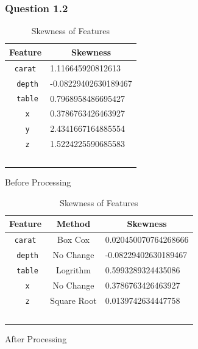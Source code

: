 \documentclass[11pt,letterpaper]{article}
\begin{document}
\subsubsection*{Question 1.2}
\begin{table}[H]
    \begin{subtable}[H]{0.45\textwidth}
    \centering
    \begin{tabular}{c l}
        \hline
        Feature & \multicolumn{1}{c}{Skewness} \\
        \hline
        \texttt{carat} & 1.116645920812613  \\ \
        \texttt{depth} & -0.08229402630189467 \\ \
        \texttt{table} &  0.7968958486695427\\ \
        \texttt{x} & 0.3786763426463927  \\ \
       \texttt{y} & 2.4341667164885554  \\ \
        \texttt{z} & 1.5224225590685583  \\ \
    \end{tabular}
    \caption{Before Processing}
    \end{subtable}
    \begin{subtable}[H]{0.45\textwidth}
        \centering
        \begin{tabular}{c c l}
            \hline
            Feature & Method & \multicolumn{1}{c}{Skewness} \\
            \hline
            \texttt{carat} & Box Cox & 0.020450070764268666 \\ \
            \texttt{depth} & No Change & -0.08229402630189467 \\ \
            \texttt{table} &  Logrithm & 0.5993289324435086\\ \
            \texttt{x} & No Change & 0.3786763426463927  \\ \
            \texttt{z} & Square Root & 0.0139742634447758  \\ \
        \end{tabular}
        \caption{After Processing}
        \end{subtable}
    \caption{Skewness of Features}
\end{table}
\end{document}
